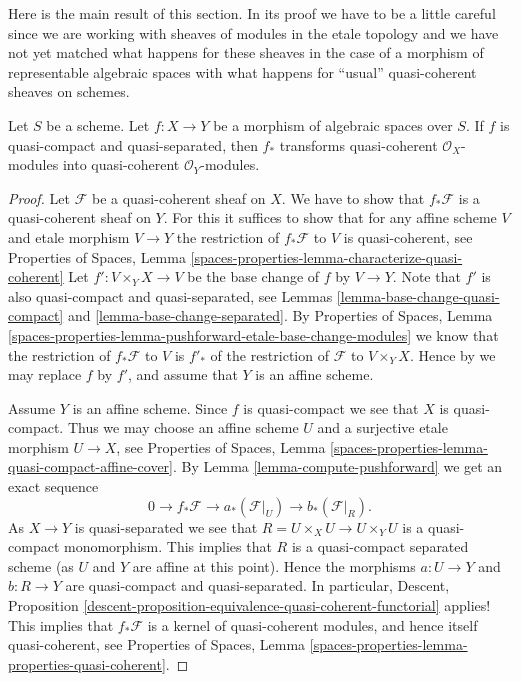 \noindent
Here is the main result of this section. In its proof we have to be
a little careful since we are working with sheaves of modules
in the etale topology and we have not yet matched what happens for
these sheaves in the case of a morphism of representable algebraic
spaces with what happens for ``usual'' quasi-coherent sheaves on schemes.

\begin{lemma}
\label{lemma-pushforward}
Let $S$ be a scheme.
Let $f : X \to Y$ be a morphism of algebraic spaces over $S$.
If $f$ is quasi-compact and quasi-separated, then $f_*$ transforms
quasi-coherent $\mathcal{O}_X$-modules into
quasi-coherent $\mathcal{O}_Y$-modules.
\end{lemma}

\begin{proof}
Let $\mathcal{F}$ be a quasi-coherent sheaf on $X$. We have to show that
$f_*\mathcal{F}$ is a quasi-coherent sheaf on $Y$. For this it suffices
to show that for any affine scheme $V$ and etale morphism $V \to Y$
the restriction of $f_*\mathcal{F}$ to $V$ is quasi-coherent, see
Properties of Spaces,
Lemma \ref{spaces-properties-lemma-characterize-quasi-coherent}
Let $f' : V \times_Y X \to V$
be the base change of $f$ by $V \to Y$. Note that $f'$ is also
quasi-compact and quasi-separated, see
Lemmas \ref{lemma-base-change-quasi-compact} and
\ref{lemma-base-change-separated}.
By
Properties of Spaces,
Lemma \ref{spaces-properties-lemma-pushforward-etale-base-change-modules}
we know that the restriction of $f_*\mathcal{F}$ to $V$ is $f'_*$ of the
restriction of $\mathcal{F}$ to $V \times_Y X$. Hence by
we may replace $f$ by $f'$, and assume that $Y$ is an affine scheme.

\medskip\noindent
Assume $Y$ is an affine scheme. Since $f$ is quasi-compact we see that $X$
is quasi-compact. Thus we may choose an affine scheme $U$ and a surjective
etale morphism $U \to X$, see
Properties of Spaces,
Lemma \ref{spaces-properties-lemma-quasi-compact-affine-cover}.
By Lemma \ref{lemma-compute-pushforward} we get an exact sequence
$$
0 \to f_*\mathcal{F} \to a_*(\mathcal{F}|_U) \to b_*(\mathcal{F}|_R).
$$
As $X \to Y$ is quasi-separated we see that $R = U \times_X U \to U \times_Y U$
is a quasi-compact monomorphism. This implies that $R$ is a quasi-compact
separated scheme (as $U$ and $Y$ are affine at this point).
Hence the morphisms $a : U \to Y$ and $b : R \to Y$ are quasi-compact and
quasi-separated. In particular,
Descent,
Proposition \ref{descent-proposition-equivalence-quasi-coherent-functorial}
applies! This implies that $f_*\mathcal{F}$ is a kernel of quasi-coherent
modules, and hence itself quasi-coherent, see
Properties of Spaces,
Lemma \ref{spaces-properties-lemma-properties-quasi-coherent}.
\end{proof}

